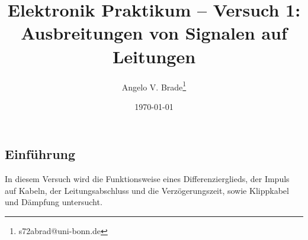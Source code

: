 \documentclass[10pt]{article}
\title{Elektronik Praktikum -- Versuch 1: Ausbreitungen von Signalen auf Leitungen}
\author[1]{Angelo V. Brade\thanks{s72abrad@uni-bonn.de}}
\affil[1]{Rheinische Friedrich-Wilhelms-Universität Bonn}
\date{\today}
\begin{document}
\maketitle
\newpage

\tableofcontents
\newpage


\pagestyle{fancy}
\fancyhead[R]{\thepage}
\fancyhead[L]{\leftmark}


\begin{multicols}{2}
	\section{\large Einführung}
	In diesem Versuch wird die Funktionsweise eines Differenzierglieds, der Impuls auf Kabeln, der Leitungsabschluss und die Verzögerungszeit, sowie Klippkabel und Dämpfung untersucht.

\end{multicols}
\end{document}
